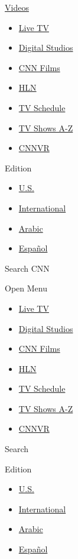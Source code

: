 \href{/videos}{Videos}

\begin{itemize}
\tightlist
\item
  \href{//cnn.it/go2}{Live TV}
\item
  \href{/specials/digital-studios}{Digital Studios}
\item
  \href{/specials/videos/digital-shorts}{CNN Films}
\item
  \href{/specials/videos/hln}{HLN}
\item
  \href{/tv/schedule/cnn}{TV Schedule}
\item
  \href{/specials/tv/all-shows}{TV Shows A-Z}
\item
  \href{/vr}{CNNVR}
\end{itemize}

Edition

\begin{itemize}
\tightlist
\item
  \href{//us.cnn.com?hpt=header_edition-picker}{U.S.}
\item
  \href{//edition.cnn.com?hpt=header_edition-picker}{International}
\item
  \href{//arabic.cnn.com?hpt=header_edition-picker}{Arabic}
\item
  \href{//cnnespanol.cnn.com?hpt=header_edition-picker}{Español}
\end{itemize}

Search CNN

Open Menu

\begin{itemize}
\tightlist
\item
  \href{//cnn.it/go2}{Live TV}
\item
  \href{/specials/digital-studios}{Digital Studios}
\item
  \href{/specials/videos/digital-shorts}{CNN Films}
\item
  \href{/specials/videos/hln}{HLN}
\item
  \href{/tv/schedule/cnn}{TV Schedule}
\item
  \href{/specials/tv/all-shows}{TV Shows A-Z}
\item
  \href{/vr}{CNNVR}
\end{itemize}

Search

Edition

\begin{itemize}
\tightlist
\item
  \href{//us.cnn.com?hpt=header_edition-picker}{U.S.}
\item
  \href{//edition.cnn.com?hpt=header_edition-picker}{International}
\item
  \href{//arabic.cnn.com?hpt=header_edition-picker}{Arabic}
\item
  \href{//cnnespanol.cnn.com?hpt=header_edition-picker}{Español}
\end{itemize}

